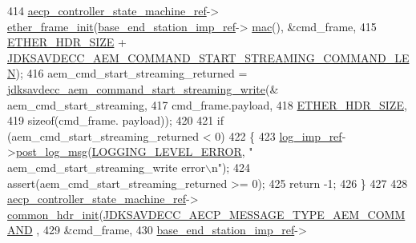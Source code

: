 \begin{DoxyCode}
414     \hyperlink{namespaceavdecc__lib_a0b1b5aea3c0490f77cbfd9178af5be22}{aecp\_controller\_state\_machine\_ref}->
      \hyperlink{classavdecc__lib_1_1aecp__controller__state__machine_a86ff947c5e6b799cfb877d3767bfa1f9}{ether\_frame\_init}(\hyperlink{classavdecc__lib_1_1descriptor__base__imp_a550c969411f5f3b69f55cc139763d224}{base\_end\_station\_imp\_ref}->
      \hyperlink{classavdecc__lib_1_1end__station__imp_a08e1bd1861b3b8f447ea374a65ac11f9}{mac}(), &cmd\_frame,
415                                                         \hyperlink{namespaceavdecc__lib_a6c827b1a0d973e18119c5e3da518e65ca9512ad9b34302ba7048d88197e0a2dc0}{ETHER\_HDR\_SIZE} + 
      \hyperlink{group__command__start__streaming_ga64b3f37bb8a2701b0fa5255a96302231}{JDKSAVDECC\_AEM\_COMMAND\_START\_STREAMING\_COMMAND\_LEN});
416     aem\_cmd\_start\_streaming\_returned = 
      \hyperlink{group__command__start__streaming_ga7bd7788fdc598aee7b74a487c1a8e03a}{jdksavdecc\_aem\_command\_start\_streaming\_write}(&
      aem\_cmd\_start\_streaming,
417                                                                                     cmd\_frame.payload,
418                                                                                     
      \hyperlink{namespaceavdecc__lib_a6c827b1a0d973e18119c5e3da518e65ca9512ad9b34302ba7048d88197e0a2dc0}{ETHER\_HDR\_SIZE},
419                                                                                     \textcolor{keyword}{sizeof}(cmd\_frame.
      payload));
420 
421     \textcolor{keywordflow}{if} (aem\_cmd\_start\_streaming\_returned < 0)
422     \{
423         \hyperlink{namespaceavdecc__lib_acbe3e2a96ae6524943ca532c87a28529}{log\_imp\_ref}->\hyperlink{classavdecc__lib_1_1log_a68139a6297697e4ccebf36ccfd02e44a}{post\_log\_msg}(\hyperlink{namespaceavdecc__lib_a501055c431e6872ef46f252ad13f85cdaf2c4481208273451a6f5c7bb9770ec8a}{LOGGING\_LEVEL\_ERROR}, \textcolor{stringliteral}{"
      aem\_cmd\_start\_streaming\_write error\(\backslash\)n"});
424         assert(aem\_cmd\_start\_streaming\_returned >= 0);
425         \textcolor{keywordflow}{return} -1;
426     \}
427 
428     \hyperlink{namespaceavdecc__lib_a0b1b5aea3c0490f77cbfd9178af5be22}{aecp\_controller\_state\_machine\_ref}->
      \hyperlink{classavdecc__lib_1_1aecp__controller__state__machine_aafc737d7ed17a62fed9df6528f18d3ec}{common\_hdr\_init}(\hyperlink{group__aecp__message__type_ga4625ce189cc209f42deb0629f48faf69}{JDKSAVDECC\_AECP\_MESSAGE\_TYPE\_AEM\_COMMAND}
      ,
429                                                        &cmd\_frame,
430                                                        \hyperlink{classavdecc__lib_1_1descriptor__base__imp_a550c969411f5f3b69f55cc139763d224}{base\_end\_station\_imp\_ref}->

\end{DoxyCode}
